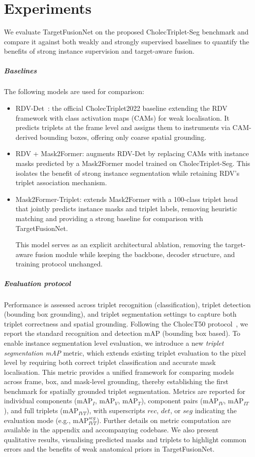 \documentclass[pdflatex,sn-mathphys-num]{sn-jnl}%
\newcommand{\mAP}{\textrm{mAP}}
\newcommand{\mysubsection}[1]{\subparagraph{#1}}
\newcommand{\revref}[2]{%
  \marginpar{\raggedright$\scriptstyle R_{#1}C_{#2}$}%
}
\DeclareRobustCommand{\robustrevref}[2]{%
\revref{#1}{#2}
}
\newcommand{\revnew}[1]{%
{\color{orange}#1}\xspace
}
\newcommand{\revref}[2]{\ignorespaces}
\newcommand{\robustrevref}[2]{\ignorespaces}
\newcommand{\revnew}[1]{#1\xspace}
\theoremstyle{thmstyleone}%
\theoremstyle{thmstyletwo}%
\theoremstyle{thmstylethree}%
\begin{document}
\section{Experiments}\label{sec:experiments}
We evaluate TargetFusionNet on the proposed CholecTriplet-Seg benchmark and compare it against both weakly and strongly supervised baselines to quantify the benefits of strong instance supervision and target-aware fusion.  

\mysubsection{Baselines}
The following models are used for comparison:
\begin{itemize}
    \item RDV-Det~\cite{nwoye2023cholectriplet2022}: the official CholecTriplet2022 baseline extending the RDV framework with class activation maps (CAMs) for weak localisation. It predicts triplets at the frame level and assigns them to instruments via CAM-derived bounding boxes, offering only coarse spatial grounding.  
    \item RDV + Mask2Former: augments RDV-Det by replacing CAMs with instance masks predicted by a Mask2Former model trained on CholecTriplet-Seg. This isolates the benefit of strong instance segmentation while retaining RDV’s triplet association mechanism.  
    \item Mask2Former-Triplet: extends Mask2Former with a 100-class triplet head that jointly predicts instance masks and triplet labels, removing heuristic matching and providing a strong baseline for comparison with TargetFusionNet.  \robustrevref{4}{4}\revnew{This model serves as an explicit architectural ablation, removing the target-aware fusion module while keeping the backbone, decoder structure, and training protocol unchanged.}
\end{itemize}


\mysubsection{Evaluation protocol}
Performance is assessed across triplet recognition (classification), triplet detection (bounding box grounding), and triplet segmentation settings to capture both triplet correctness and spatial grounding. Following the CholecT50 protocol~\cite{nwoye2023datasplitsmetricsmethod}, we report the standard recognition and detection mAP (bounding box based). 
%
To enable instance segmentation level evaluation, we introduce a new \emph{triplet segmentation mAP} metric, which extends existing triplet evaluation to the pixel level by requiring both correct triplet classification and accurate mask localisation. This metric provides a unified framework for comparing models across frame, box, and mask-level grounding, thereby establishing the first benchmark for spatially grounded triplet segmentation.
%
Metrics are reported for individual components ($\mAP_I$, $\mAP_V$, $\mAP_T$), component pairs ($\mAP_{IV}$, $\mAP_{IT}$), and full triplets ($\mAP_{IVT}$), with superscripts $rec$, $det$, or $seg$ indicating the evaluation mode (e.g., $\mAP_{IVT}^{seg}$). Further details on metric computation are available in the appendix and accompanying codebase.  
%
We also present qualitative results, visualising predicted masks and triplets to highlight common errors and the benefits of weak anatomical priors in TargetFusionNet.
\end{document}

